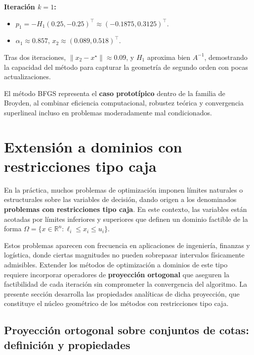 \documentclass[
  spanish,
  us-letterpaper,
  DIV=11,
  numbers=noendperiod]{scrreprt}
\providecommand{\tightlist}{%
  \setlength{\itemsep}{0pt}\setlength{\parskip}{0pt}}
\numberwithin{equation}{section}
\begin{document}
\textbf{Iteración \(k = 1\):}

\begin{itemize}
\tightlist
\item
  \(p_1 = -H_1 (0.25, -0.25)^\top \approx (-0.1875, 0.3125)^\top\).
\item
  \(\alpha_1 \approx 0.857\), \(x_2 \approx (0.089, 0.518)^\top\).
\end{itemize}

Tras dos iteraciones, \(\|x_2 - x^\star\| \approx 0.09\), y \(H_1\)
aproxima bien \(A^{-1}\), demostrando la capacidad del método para
capturar la geometría de segundo orden con pocas actualizaciones.

El método BFGS representa el \textbf{caso prototípico} dentro de la
familia de Broyden, al combinar eficiencia computacional, robustez
teórica y convergencia superlineal incluso en problemas moderadamente
mal condicionados.

\section{Extensión a dominios con restricciones tipo
caja}\label{extensiuxf3n-a-dominios-con-restricciones-tipo-caja}

En la práctica, muchos problemas de optimización imponen límites
naturales o estructurales sobre las variables de decisión, dando origen
a los denominados \textbf{problemas con restricciones tipo caja}. En
este contexto, las variables están acotadas por límites inferiores y
superiores que definen un dominio factible de la forma
\(\Omega = \{x \in \mathbb{R}^n : \ell_i \le x_i \le u_i\}\).

Estos problemas aparecen con frecuencia en aplicaciones de ingeniería,
finanzas y logística, donde ciertas magnitudes no pueden sobrepasar
intervalos físicamente admisibles. Extender los métodos de optimización
a dominios de este tipo requiere incorporar operadores de
\textbf{proyección ortogonal} que aseguren la factibilidad de cada
iteración sin comprometer la convergencia del algoritmo. La presente
sección desarrolla las propiedades analíticas de dicha proyección, que
constituye el núcleo geométrico de los métodos con restricciones tipo
caja.

\subsection{Proyección ortogonal sobre conjuntos de cotas: definición y
propiedades}\label{proyecciuxf3n-ortogonal-sobre-conjuntos-de-cotas-definiciuxf3n-y-propiedades}
\end{document}
